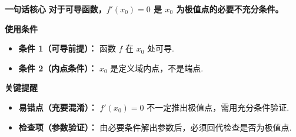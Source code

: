 \begin{summarybox}
	\textbf{\textcolor{CSummary}{一句话核心}}
	\textbf{对于可导函数，$f'(x_0)=0$ 是 $x_0$ 为极值点的必要不充分条件。}

	\medskip
	\textbf{\textcolor{CSummary}{使用条件}}
	\begin{itemize}[leftmargin=*, itemsep=0.5em, topsep=0.4em]
		\item \textbf{条件 1（可导前提）：} 函数 $f$ 在 $x_0$ 处可导.
		\item \textbf{条件 2（内点条件）：} $x_0$ 是定义域内点，不是端点.
	\end{itemize}

	\medskip
	\textbf{\textcolor{CSummary}{关键提醒}}
	\begin{itemize}[leftmargin=*, itemsep=0.5em, topsep=0.4em]
		\item \textbf{易错点（充要混淆）：} $f'(x_0)=0$ 不一定推出极值点，需用充分条件验证.
		\item \textbf{检查项（参数验证）：} 由必要条件解出参数后，必须回代检查是否为极值点.
	\end{itemize}

\end{summarybox}
